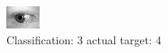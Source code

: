 \begin{figure}[h!]
\begin{center}
\includegraphics[width=0.60\columnwidth]{figures/ID685_class_3_target_4.png}
\end{center}
\caption{ Classification: 3 actual target: 4}
\label{fig:ID685_class_3_target_4}
\end{figure}
